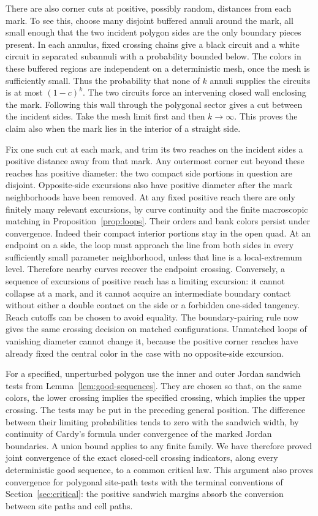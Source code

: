 There are also corner cuts at positive, possibly random, distances from each
mark. To see this, choose many disjoint buffered annuli around the mark, all
small enough that the two incident polygon sides are the only boundary pieces
present. In each annulus, fixed crossing chains give a black circuit and a
white circuit in separated subannuli with a probability bounded below.
The colors in these buffered regions are independent on a deterministic
mesh, once the mesh is sufficiently small. Thus the probability that none
of $k$ annuli supplies the circuits is at most $(1-c)^k$. The two circuits
force an intervening closed wall enclosing the mark. Following this wall
through the polygonal sector gives a cut between the incident sides.
Take the mesh limit first and then $k\to\infty$. This proves the claim also
when the mark lies in the interior of a straight side.

Fix one such cut at each mark, and trim its two reaches on the incident sides
a positive distance away from that mark. Any outermost corner cut beyond
these reaches has positive diameter: the two compact side portions in
question are disjoint. Opposite-side excursions also have positive diameter
after the mark neighborhoods have been removed. At any fixed positive reach
there are only finitely many relevant excursions, by curve continuity and
the finite macroscopic matching in Proposition~\ref{prop:loops}. Their orders
and bank colors persist under convergence. Indeed their compact interior
portions stay in the open quad. At an endpoint on a side, the loop must
approach the line from both sides in every sufficiently small parameter
neighborhood, unless that line is a local-extremum level. Therefore nearby
curves recover the endpoint crossing. Conversely, a sequence of excursions
of positive reach has a limiting excursion: it cannot collapse at a mark,
and it cannot acquire an intermediate boundary contact without either a
double contact on the side or a forbidden one-sided tangency. Reach cutoffs
can be chosen to avoid equality. The boundary-pairing rule now gives the same
crossing decision on matched configurations. Unmatched loops of vanishing
diameter cannot change it, because the positive corner reaches have already
fixed the central color in the case with no opposite-side excursion.

For a specified, unperturbed polygon use the inner and outer Jordan sandwich
tests from Lemma~\ref{lem:good-sequences}. They are chosen so that, on the same
colors, the lower crossing implies the specified crossing, which implies
the upper crossing. The tests may be put in the preceding general position.
The difference between their limiting probabilities tends to zero with the
sandwich width, by continuity of Cardy's formula under convergence of the
marked Jordan boundaries. A union bound applies to any finite family. We
have therefore proved joint convergence of the exact closed-cell crossing
indicators, along every deterministic good sequence, to a common critical
law. This argument also proves convergence for polygonal site-path tests
with the terminal conventions of Section~\ref{sec:critical}: the positive
sandwich margins absorb the conversion between site paths and cell paths.

